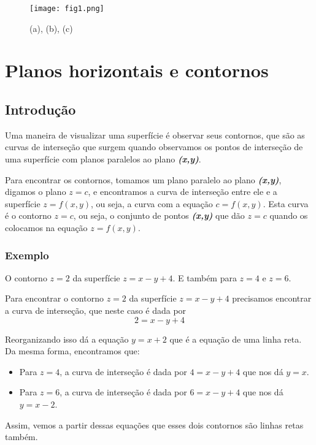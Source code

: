 \documentclass[a4paper]{article}
\begin{document}
\begin{figure}[ht]
    \texttt{[image: fig1.png]}
    \caption{(a), (b), (c)}
    \label{fig1}
\end{figure}
\section{Planos horizontais e contornos}
\subsection*{Introdução}
\par Uma maneira de visualizar uma superfície é observar seus contornos, que são as curvas de interseção que surgem quando observamos os pontos de interseção de uma superfície com planos paralelos ao plano \textit{\textbf{(x,y)}}.

Para encontrar os contornos, tomamos um plano paralelo ao plano \textit{\textbf{(x,y)}}, digamos o plano $z = c$, e encontramos a curva de interseção entre ele e a superfície $z = f(x,y)$, ou seja, a curva com a equação $c = f(x,y)$. Esta curva é o contorno $z = c$, ou seja, o conjunto de pontos \textit{\textbf{(x,y)}} que dão $z = c$ quando os colocamos na equação $z = f(x,y)$.
\subsubsection*{Exemplo}
O contorno $z = 2$ da superfície $z = x - y + 4$. E também para $z = 4$ e $z = 6$.
\par Para encontrar o contorno $z = 2$ da superfície $z = x - y + 4$ precisamos encontrar a curva de interseção, que neste caso é dada por
    \begin{equation}
         2 = x - y + 4
    \end{equation}
\par Reorganizando isso dá a equação $y = x + 2$ que é a equação de uma linha reta.
Da mesma forma, encontramos que:
\begin{itemize}
    \item Para $z = 4$, a curva de interseção é dada por $4 = x - y + 4$ que nos dá $y = x$.

    \item Para $z = 6$, a curva de interseção é dada por $6 = x - y + 4$ que nos dá $y = x - 2$.
\end{itemize}
Assim, vemos a partir dessas equações que esses dois contornos são linhas retas também.
\end{document}
